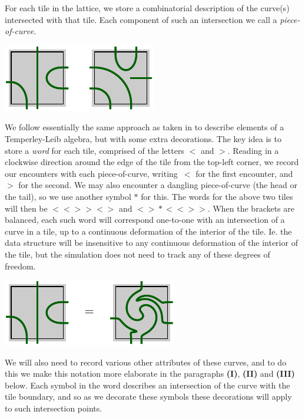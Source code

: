\documentclass[aps, letterpaper, onecolumn, superscriptaddress, notitlepage, 10pt]{revtex4-1}
\begin{document}
For each tile in the lattice,
we store a combinatorial
description of the curve(s) intersected with that tile.
Each component of such an intersection we call a \emph{piece-of-curve.}
\begin{center}
\includegraphics[]{pic-cells.pdf}
\end{center}

We follow essentially the same approach as taken in \cite{Abramsky2007} 
to describe elements of a Temperley-Leib algebra, but
with some extra decorations.
The key idea is to store a \emph{word} for each tile, comprised of
the letters $\bigl<$ and $\bigr>$.
Reading in a clockwise direction around the edge of
the tile from the top-left corner,
we record our encounters with each piece-of-curve,
writing~$\bigl<$ for the first encounter, and~$\bigr>$ for the
second.
We may also encounter a dangling piece-of-curve
(the head or the tail), so we use another symbol $*$ for this.
The words for the above two tiles will then be 
$\bigl<\bigl<\bigr>\bigr>\bigl<\bigr>$ and $\bigl<\bigr>*\bigl<\bigl<\bigr>\bigr>.$
When the brackets are balanced,
each such word will correspond one-to-one with an intersection
of a curve in a tile, up to a continuous deformation of the interior of the tile.
Ie. the data structure 
will be insensitive to any continuous deformation of the interior of the tile,
but the simulation does not need to track any of these degrees of freedom.

\begin{center}
\includegraphics[]{pic-cells-0.pdf}
\end{center}

We will also need to record
various other attributes of these curves,
and to do this we make this notation more elaborate
in the paragraphs {\bf (I)}, {\bf(II)} and {\bf(III)} below.
Each symbol in the word describes an intersection of
the curve with the tile boundary,
and so as we decorate these symbols these decorations will
apply to such intersection points.
\end{document}
